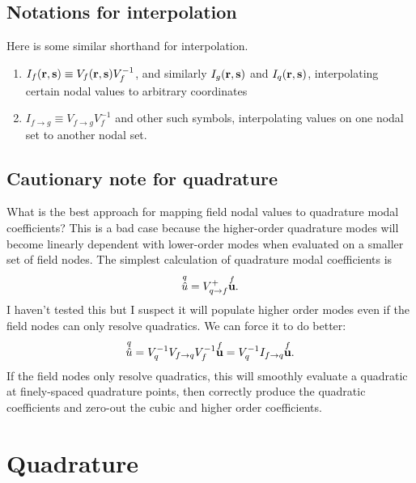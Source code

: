 \subsection{Notations for interpolation}

Here is some similar shorthand for interpolation.
%
\begin{enumerate}
  \item $I_f(\textbf{r}, \textbf{s}) \equiv V_f(\textbf{r}, \textbf{s}) V_f^{-1}$, and similarly $I_g(\textbf{r}, \textbf{s})$ and $I_q(\textbf{r}, \textbf{s})$, interpolating certain nodal values to arbitrary coordinates
  \item $I_{f \rightarrow g} \equiv V_{f \rightarrow g} V_f^{-1}$ and other such symbols, interpolating values on one nodal set to another nodal set.
\end{enumerate}

\subsection{Cautionary note for quadrature}

What is the best approach for mapping field nodal values to quadrature modal coefficients?  This is a bad case because the higher-order quadrature modes will become linearly dependent with lower-order modes when evaluated on a smaller set of field nodes.  The simplest calculation of quadrature modal coefficients is
%
\begin{equation}
\overset{q}{\hat u} = V_{q \rightarrow f}^+ \overset{f}{\textbf{u}}.
\end{equation}
%
I haven't tested this but I suspect it will populate higher order modes even if the field nodes can only resolve quadratics.  We can force it to do better:
%
\begin{equation}
\overset{q}{\hat u} = V_q^{-1} V_{f \rightarrow q} V_f^{-1} \overset{f}{\textbf{u}} = V_q^{-1} I_{f \rightarrow q} \overset{f}{\textbf{u}}.
\end{equation}
%
If the field nodes only resolve quadratics, this will smoothly evaluate a quadratic at finely-spaced quadrature points, then correctly produce the quadratic coefficients and zero-out the cubic and higher order coefficients.

\section{Quadrature}

